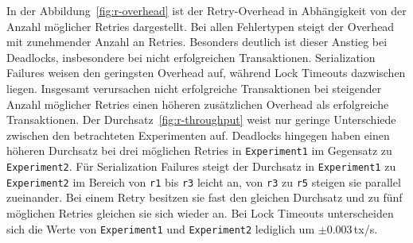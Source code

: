 In der Abbildung~\ref{fig:r-overhead} ist der Retry-Overhead in Abhängigkeit von der Anzahl möglicher Retries
dargestellt.
Bei allen Fehlertypen steigt der Overhead mit zunehmender Anzahl an Retries.
Besonders deutlich ist dieser Anstieg bei Deadlocks, insbesondere bei nicht erfolgreichen Transaktionen.
Serialization Failures weisen den geringsten Overhead auf, während Lock Timeouts dazwischen liegen.
Insgesamt verursachen nicht erfolgreiche Transaktionen bei steigender Anzahl möglicher Retries einen höheren
zusätzlichen Overhead als erfolgreiche Transaktionen.
Der Durchsatz~\ref{fig:r-throughput} weist nur geringe Unterschiede zwischen den betrachteten Experimenten auf.
Deadlocks hingegen haben einen höheren Durchsatz bei drei möglichen Retries in \texttt{Experiment1} im Gegensatz zu
\texttt{Experiment2}.
Für Serialization Failures steigt der Durchsatz in \texttt{Experiment1} zu \texttt{Experiment2}
im Bereich von \texttt{r1} bis \texttt{r3} leicht an, von \texttt{r3} zu \texttt{r5} steigen sie parallel zueinander.
Bei einem Retry besitzen sie fast den gleichen Durchsatz und zu fünf möglichen Retries gleichen sie sich wieder an.
Bei Lock Timeouts unterscheiden sich die Werte von \texttt{Experiment1} und \texttt{Experiment2} lediglich um
$\pm$0.003\,tx/s.